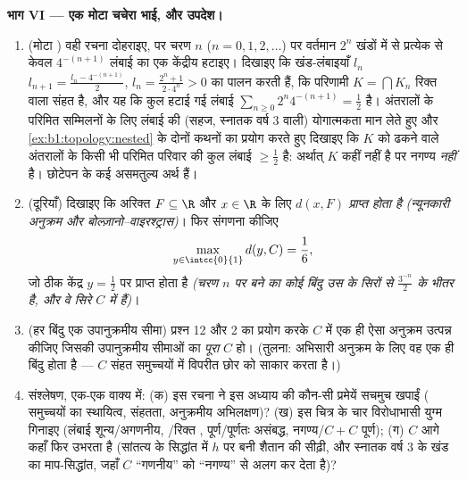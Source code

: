 \begin{problem}[{सप्ताहांत समस्या --- कैंटर का मध्य-तिहाई \omterm{def:b1:logic:sets}{समुच्चय}: लंबाई शून्य, अगणनीय, पूर्ण,
और $C + C =
\intcc{0}{2}$}]
\medskip \noindent\textbf{भाग VI --- एक मोटा चचेरा भाई, और उपदेश।}
\begin{enumerate}[resume]
  \item (मोटा ) वही रचना दोहराइए, पर चरण $n$ ($n = 0, 1, 2,
  \dots$) पर वर्तमान $2^n$ खंडों में से प्रत्येक से केवल $4^{-(n+1)}$ लंबाई
  का एक केंद्रीय   हटाइए। दिखाइए कि खंड-लंबाइयाँ $l_n$ $l_{n+1} =
  \frac{l_n - 4^{-(n+1)}}{2}$, $l_n = \frac{2^n + 1}{2\cdot 4^n} > 0$ का
  पालन करती हैं, कि परिणामी $K = \bigcap K_n$ रिक्त  वाला संहत
   है, और यह कि कुल हटाई गई लंबाई $\sum_{n\geq0} 2^n 4^{-(n+1)} =
  \frac12$ है। अंतरालों के परिमित सम्मिलनों के लिए लंबाई की (सहज, स्नातक
  वर्ष 3 वाली) योगात्मकता मान लेते हुए और \cref{ex:b1:topology:nested} के
  दोनों कथनों का प्रयोग करते हुए दिखाइए कि $K$ को ढकने वाले  अंतरालों
  के किसी भी परिमित परिवार की कुल लंबाई $\geq \frac12$ है: अर्थात् $K$ कहीं
   नहीं है पर नगण्य \emph{नहीं} है। छोटेपन के कई असमतुल्य अर्थ हैं।
  \item (दूरियाँ) दिखाइए कि अरिक्त  $F \subseteq \R$ और $x \in \R$ के
  लिए  $d(x, F)$ \emph{प्राप्त होता है} \emph{(न्यूनकारी अनुक्रम और
  बोल्ज़ानो--वाइरश्ट्रास)}। फिर संगणना कीजिए
        \[
        \max_{y \in \intcc{0}{1}} d(y, C) = \frac16 ,
        \]
        जो ठीक केंद्र $y = \frac12$ पर प्राप्त होता है \emph{(चरण $n$ पर बने
         का कोई बिंदु उस  के सिरों से $\frac{3^{-n}}{2}$ के भीतर
        है, और वे सिरे $C$ में हैं)}।
  \item (हर बिंदु एक उपानुक्रमीय सीमा) प्रश्न 12 और 2 का प्रयोग करके $C$ में
  एक ही ऐसा अनुक्रम उत्पन्न कीजिए जिसकी उपानुक्रमीय सीमाओं का 
  \emph{पूरा} $C$ हो। (तुलना: अभिसारी अनुक्रम के लिए वह  एक ही बिंदु
  होता है --- $C$ संहत समुच्चयों में विपरीत छोर को साकार करता है।)
  \item संश्लेषण, एक-एक वाक्य में: (क) इस रचना ने इस अध्याय की कौन-सी
  प्रमेयें सचमुच खपाईं ( समुच्चयों का स्थायित्व, संहतता, अनुक्रमीय
  अभिलक्षण)? (ख) इस चित्र के चार विरोधाभासी युग्म गिनाइए (लंबाई
  शून्य/अगणनीय, /रिक्त , पूर्ण/पूर्णतः असंबद्ध, नगण्य/$C+C$
  पूर्ण); (ग) $C$ आगे कहाँ फिर उभरता है (सांतत्य के सिद्धांत में $h$ पर बनी
  शैतान की सीढ़ी, और स्नातक वर्ष 3 के खंड का माप-सिद्धांत, जहाँ $C$
  ``गणनीय'' को ``नगण्य'' से अलग कर देता है)?
\end{enumerate}
\end{problem}
